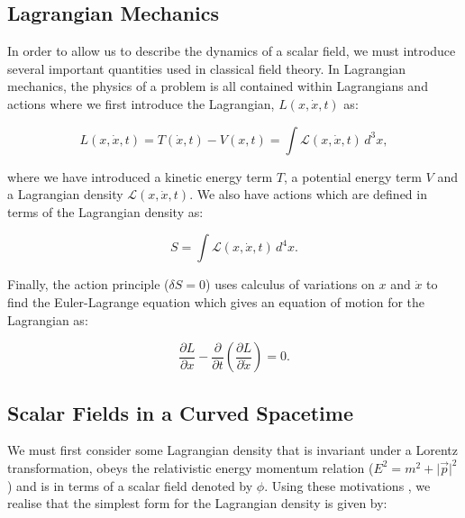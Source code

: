 \documentclass[a4paper,12pt,twoside]{report}
\newcommand{\abs}[1]{\lvert#1\rvert}
\begin{document}
\subsection{Lagrangian Mechanics} \label{subsec:LagMechs}

In order to allow us to describe the dynamics of a scalar field, we must introduce several important quantities used in classical field theory. In Lagrangian mechanics, the physics of a problem is all contained within Lagrangians and actions where we first introduce the Lagrangian, $L(x, \dot{x}, t)$ as:

\begin{equation}
L(x, \dot{x}, t) = T(\dot{x}, t) - V(x, t) = \int \mathcal{L}(x, \dot{x}, t) \hspace{2pt} d^{3}x, \label{eq2.10}
\end{equation}

where we have introduced a kinetic energy term $T$, a potential energy term $V$ and a Lagrangian density $\mathcal{L}(x, \dot{x}, t)$. We also have actions which are defined in terms of the Lagrangian density as:

\begin{equation}
S = \int \mathcal{L}(x, \dot{x}, t) \hspace{2pt} d^{4}x. \label{eq2.11}
\end{equation}

Finally, the action principle ($\delta S = 0$) uses calculus of variations on $x$ and $\dot{x}$ \cite{kibble2004classical} to find the Euler-Lagrange equation which gives an equation of motion for the Lagrangian as:

\begin{equation}
\frac{\partial L}{\partial x} - \frac{\partial}{\partial t}\left(\frac{\partial L}{\partial \dot{x}} \right) = 0. \label{eq2.12}
\end{equation}

\subsection{Scalar Fields in a Curved Spacetime} \label{subsec:ScalFieldsCurvST}

We must first consider some Lagrangian density that is invariant under a Lorentz transformation, obeys the relativistic energy momentum relation ($E^{2} = m^{2} + \abs{\vec{p}}^{2}$) and is in terms of a scalar field denoted by $\phi$. Using these motivations \cite{mandl2010quantum}, we realise that the simplest form for the Lagrangian density is given by:
\end{document}
